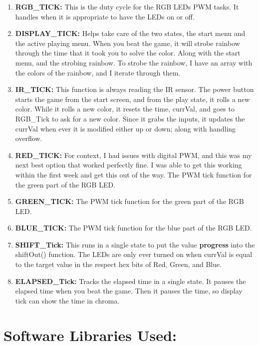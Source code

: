 \documentclass[12pt]{article}
\begin{document}
\begin{enumerate}
  \item \textbf{RGB_TICK:}
    This is the duty cycle for the RGB LEDs PWM tasks.
    It handles when it is appropriate to have the LEDs on or off.
  \item \textbf{DISPLAY_TICK:}
    Helps take care of the two states, the start menu and the active playing menu.
    When you beat the game, it will strobe rainbow through the time that it took you to solve the color.
    Along with the start menu, and the strobing rainbow. 
    To strobe the rainbow, I have an array with the colors of the rainbow,
    and I iterate through them.
  \item \textbf{IR_TICK:}
    This function is always reading the IR sensor. 
    The power button starts the game from the start screen, and from the play state, it rolls a new color.
    While it rolls a new color, it resets the time, currVal, and goes to RGB_Tick to ask for a new color. 
    Since it grabs the inputs, it updates the currVal when ever it is modified either up or down;
    along with handling overflow.
  \item \textbf{RED_TICK:}
    For context, I had issues with digital PWM, and this was my next best option that worked perfectly fine. 
    I was able to get this working within the first week and get this out of the way.
    The PWM tick function for the green part of the RGB LED.
  \item \textbf{GREEN_TICK:}
    The PWM tick function for the green part of the RGB LED.
  \item \textbf{BLUE_TICK:}
    The PWM tick function for the blue part of the RGB LED.
  \item \textbf{SHIFT_Tick:}
    This runs in a single state to put the value \textbf{progress} into 
    the shiftOut() function. The LEDs are only ever turned on when 
    currVal is equal to the target value in the respect hex bits of Red, Green, and Blue.
  \item \textbf{ELAPSED_Tick:}
    Tracks the elapsed time in a single state.
    It pauses the elapsed time when you beat the game. 
    Then it pauses the time, so display tick can show the time in chroma.
\end{enumerate}

\pagebreak
\section{Software Libraries Used:}
\end{document}
